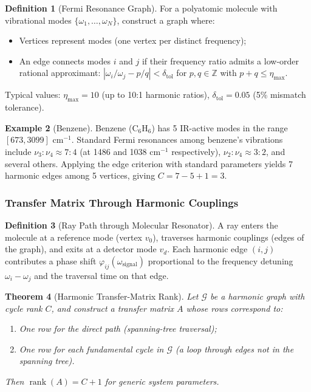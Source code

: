 \documentclass[11pt,twocolumn,a4paper]{article}
\newtheorem{theorem}{Theorem}[section]
\theoremstyle{definition}
\newtheorem{definition}[theorem]{Definition}
\newtheorem{example}[theorem]{Example}
\DeclareMathOperator{\rank}{rank}
\newcommand{\calG}{\mathcal{G}}
\newcommand{\abs}[1]{\left|#1\right|}
\begin{document}
\begin{definition}[Fermi Resonance Graph]
For a polyatomic molecule with vibrational modes $\{\omega_1, \ldots, \omega_N\}$, construct a graph where:
\begin{itemize}[nosep]
\item Vertices represent modes (one vertex per distinct frequency);
\item An edge connects modes $i$ and $j$ if their frequency ratio admits a low-order rational approximant: $\abs{\omega_i/\omega_j - p/q} < \delta_{\text{tol}}$ for $p,q \in \mathbb{Z}$ with $p+q \leq \eta_{\max}$.
\end{itemize}
Typical values: $\eta_{\max} = 10$ (up to 10:1 harmonic ratios), $\delta_{\text{tol}} = 0.05$ (5\% mismatch tolerance).
\end{definition}

\begin{example}[Benzene]
Benzene (C$_6$H$_6$) has 5 IR-active modes in the range $[673, 3099]$ cm$^{-1}$. Standard Fermi resonances among benzene's vibrations include $\nu_3 : \nu_4 \approx 7:4$ (at 1486 and 1038 cm$^{-1}$ respectively), $\nu_2 : \nu_4 \approx 3:2$, and several others. Applying the edge criterion with standard parameters yields 7 harmonic edges among 5 vertices, giving $C = 7 - 5 + 1 = 3$.
\end{example}

\subsubsection{Transfer Matrix Through Harmonic Couplings}

\begin{definition}[Ray Path through Molecular Resonator]
A ray enters the molecule at a reference mode (vertex $v_0$), traverses harmonic couplings (edges of the graph), and exits at a detector mode $v_d$. Each harmonic edge $(i,j)$ contributes a phase shift $\varphi_{ij}(\omega_{\text{signal}})$ proportional to the frequency detuning $\omega_i - \omega_j$ and the traversal time on that edge.
\end{definition}

\begin{theorem}[Harmonic Transfer-Matrix Rank]
\label{thm:harmonic-rank}
Let $\calG$ be a harmonic graph with cycle rank $C$, and construct a transfer matrix $A$ whose rows correspond to:
\begin{enumerate}[nosep,label=(\roman*)]
\item One row for the direct path (spanning-tree traversal);
\item One row for each fundamental cycle in $\calG$ (a loop through edges not in the spanning tree).
\end{enumerate}
Then $\rank(A) = C+1$ for generic system parameters.
\end{theorem}
\end{document}
